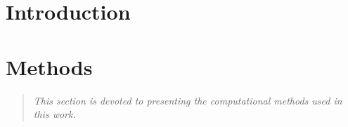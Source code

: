 \documentclass[dissertation]{aaltoseries}
\begin{document}
\tableofcontents

\newpage

 \cleardoublepage




 \setcounter{page}{1}

\thispagestyle{empty}

\chapter{Introduction}






%
%
\chapter{Methods}

\begin{quote}
 \textit{This section is devoted to presenting the computational methods used in this work.}
\end{quote}




\end{document}
